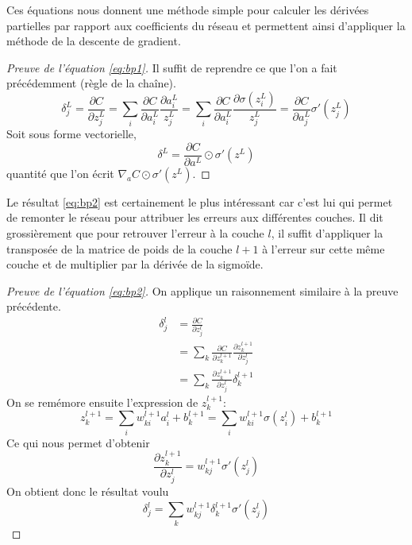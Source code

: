 Ces équations nous donnent une méthode simple pour calculer les dérivées partielles 
par rapport aux coefficients du réseau et permettent ainsi d'appliquer la méthode 
de la descente de gradient.

\begin{proof}[Preuve de l'équation \ref{eq:bp1}]
Il suffit de reprendre ce que l'on a fait précédemment (règle de la chaîne). 
\[
\delta_{j}^{L} = \frac{\partial C}{\partial z_{j}^{L}} =
 \sum_{i} \frac{\partial C}{\partial a_{i}^{L}} \frac{\partial a_{i}^{L}}{z_{j}^{L}} =
 \sum_{i} \frac{\partial C}{\partial a_{i}^{L}} \frac{\partial \sigma(z_{i}^{L})}{z_{j}^{L}} =
 \frac{\partial C}{\partial a_{j}^{L}} \sigma'(z_{j}^{L})
\]
Soit sous forme vectorielle,
\[
\delta^{L} = \frac{\partial C}{\partial a^{L}} \odot \sigma'(z^{L})
\]
quantité que l'on écrit $\nabla_{a} C \odot \sigma'(z^{L})$.
\end{proof}

\vspace{1em}

Le résultat \ref{eq:bp2} est certainement le plus intéressant car c'est lui qui permet 
de remonter le réseau pour attribuer les erreurs aux différentes couches. 
Il dit grossièrement que pour retrouver l'erreur à la couche $l$, il suffit 
d'appliquer la transposée de la matrice de poids de la couche $l+1$ à l'erreur 
sur cette même couche et de multiplier par la dérivée de la sigmoïde.

\begin{proof}[Preuve de l'équation \ref{eq:bp2}]
On applique un raisonnement similaire à la preuve précédente.
\begin{align}
  \delta_{j}^{l} &= \frac{\partial C}{\partial z_{j}^{l}} \\
                 &= \sum_{k} \frac{\partial C}{\partial z_{k}^{l+1}} \frac{\partial z_{k}^{l+1}}{\partial z_{j}^{l}} \\
				 &= \sum_{k} \frac{\partial z_{k}^{l+1}}{\partial z_{j}^{l}} \delta_{k}^{l+1}
\end{align}
On se remémore ensuite l'expression de $z_{k}^{l+1}$:
\[
z_{k}^{l+1} = \sum_{i} w_{ki}^{l+1} a_{i}^{l} + b_{k}^{l+1} = \sum_{i} w_{ki}^{l+1} \sigma(z_{i}^{l}) + b_{k}^{l+1}
\]
Ce qui nous permet d'obtenir
\[
\frac{\partial z_{k}^{l+1}}{\partial z_{j}^{l}} = w_{kj}^{l+1} \sigma'(z_{j}^{l})
\]
On obtient donc le résultat voulu
\[
\delta_{j}^{l} = \sum_{k} w_{kj}^{l+1} \delta_{k}^{l+1} \sigma'(z_{j}^{l})
\]
\end{proof}

\vspace{1em}

